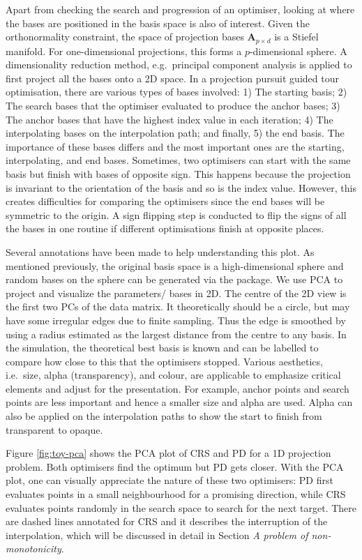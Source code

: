 Apart from checking the search and progression of an optimiser, looking
at where the bases are positioned in the basis space is also of
interest. Given the orthonormality constraint, the space of projection
bases \(\mathbf{A}_{p \times d}\) is a Stiefel manifold. For
one-dimensional projections, this forms a \(p\)-dimensional sphere. A
dimensionality reduction method, e.g.~principal component analysis is
applied to first project all the bases onto a 2D space. In a projection
pursuit guided tour optimisation, there are various types of bases
involved: 1) The starting basis; 2) The search bases that the optimiser
evaluated to produce the anchor bases; 3) The anchor bases that have the
highest index value in each iteration; 4) The interpolating bases on the
interpolation path; and finally, 5) the end basis. The importance of
these bases differs and the most important ones are the starting,
interpolating, and end bases. Sometimes, two optimisers can start with
the same basis but finish with bases of opposite sign. This happens
because the projection is invariant to the orientation of the basis and
so is the index value. However, this creates difficulties for comparing
the optimisers since the end bases will be symmetric to the origin. A
sign flipping step is conducted to flip the signs of all the bases in
one routine if different optimisations finish at opposite places.

Several annotations have been made to help understanding this plot. As
mentioned previously, the original basis space is a high-dimensional
sphere and random bases on the sphere can be generated via the
 \citep{geozoo} package. We use PCA to project and
visualize the parameters/ bases in 2D. The centre of the 2D view is the
first two PCs of the data matrix. It theoretically should be a circle,
but may have some irregular edges due to finite sampling. Thus the edge
is smoothed by using a radius estimated as the largest distance from the
centre to any basis. In the simulation, the theoretical best basis is
known and can be labelled to compare how close to this that the
optimisers stopped. Various aesthetics, i.e.~size, alpha (transparency),
and colour, are applicable to emphasize critical elements and adjust for
the presentation. For example, anchor points and search points are less
important and hence a smaller size and alpha are used. Alpha can also be
applied on the interpolation paths to show the start to finish from
transparent to opaque.

Figure \ref{fig:toy-pca} shows the PCA plot of CRS and PD for a 1D
projection problem. Both optimisers find the optimum but PD gets closer.
With the PCA plot, one can visually appreciate the nature of these two
optimisers: PD first evaluates points in a small neighbourhood for a
promising direction, while CRS evaluates points randomly in the search
space to search for the next target. There are dashed lines annotated
for CRS and it describes the interruption of the interpolation, which
will be discussed in detail in Section \emph{A problem of
non-monotonicity}.

